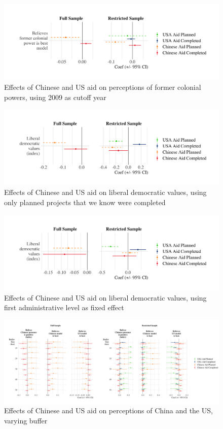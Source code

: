 \documentclass[9pt]{article}
\begin{document}
\begin{figure}[H]
\centering
\includegraphics[width=1\textwidth]{figures/figure_a7.png}
\caption{Effects of Chinese and US aid on perceptions of former colonial powers, using 2009 as cutoff year}
\end{figure}

\begin{figure}[H]
\centering
\includegraphics[width=1\textwidth]{figures/figure_a8.png}
\caption{Effects of Chinese and US aid on liberal democratic values, using only planned projects that we know were completed}
\end{figure}

\begin{figure}[H]
\centering
\includegraphics[width=1\textwidth]{figures/figure_a9.png}
\caption{Effects of Chinese and US aid on liberal democratic values, using first administrative level as fixed effect}
\end{figure}

\begin{figure}[H]
\centering
\includegraphics[width=1\textwidth]{figures/figure_a10.png}
\caption{Effects of Chinese and US aid on perceptions of China and the US, varying buffer}
\end{figure}
\end{document}
